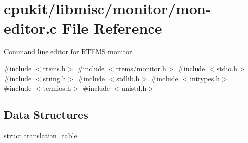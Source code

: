 \hypertarget{mon-editor_8c}{}\section{cpukit/libmisc/monitor/mon-\/editor.c File Reference}
\label{mon-editor_8c}


Command line editor for R\+T\+E\+MS monitor.  


{\ttfamily \#include $<$rtems.\+h$>$}\newline
{\ttfamily \#include $<$rtems/monitor.\+h$>$}\newline
{\ttfamily \#include $<$stdio.\+h$>$}\newline
{\ttfamily \#include $<$string.\+h$>$}\newline
{\ttfamily \#include $<$stdlib.\+h$>$}\newline
{\ttfamily \#include $<$inttypes.\+h$>$}\newline
{\ttfamily \#include $<$termios.\+h$>$}\newline
{\ttfamily \#include $<$unistd.\+h$>$}\newline
\subsection*{Data Structures}
\begin{DoxyCompactItemize}
\item 
struct \mbox{\hyperlink{structtranslation__table}{translation\+\_\+table}}
\end{DoxyCompactItemize}
